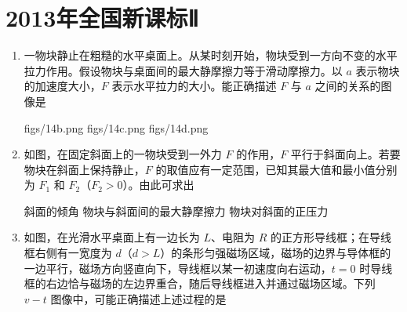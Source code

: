 \documentclass[\gkver]{gaokaozhenti}
\begin{document}
\chapter{2013年全国新课标Ⅱ}

\begin{enumerate}
\item
一物块静止在粗糙的水平桌面上。从某时刻开始，物块受到一方向不变的水平拉力作用。假设物块与桌面间的最大静摩擦力等于滑动摩擦力。以 $a$ 表示物块的加速度大小，$F$ 表示水平拉力的大小。能正确描述 $F$ 与 $a$ 之间的关系的图像是

{figs/14b.png}
{figs/14c.png}
{figs/14d.png}


\item
如图，在固定斜面上的一物块受到一外力 $F$ 的作用，$F$ 平行于斜面向上。若要物块在斜面上保持静止，$F$ 的取值应有一定范围，已知其最大值和最小值分别为 $F_{1}$ 和 $F_{2}$（$F_{2}>0$）。由此可求出


{斜面的倾角}
{物块与斜面间的最大静摩擦力}
{物块对斜面的正压力}


\item
如图，在光滑水平桌面上有一边长为 $L$、电阻为 $R$ 的正方形导线框；在导线框右侧有一宽度为 $d$（$d>L$）的条形匀强磁场区域，磁场的边界与导体框的一边平行，磁场方向竖直向下，导线框以某一初速度向右运动，$t=0$ 时导线框的右边恰与磁场的左边界重合，随后导线框进入并通过磁场区域。下列 $v-t$ 图像中，可能正确描述上述过程的是


\end{enumerate}
\end{document}
